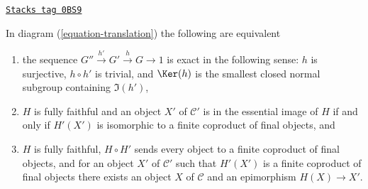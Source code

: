 \begin{lemma}
\label{pione-lemma-functoriality-galois-ses}
\href{https://stacks.math.columbia.edu/tag/0BS9}{\texttt{Stacks tag 0BS9}}

In diagram (\ref{equation-translation}) the following are equivalent
\begin{enumerate}
\item the sequence $G'' \xrightarrow{h'} G' \xrightarrow{h} G \to 1$
is exact in the following sense: $h$ is surjective, $h \circ h'$ is trivial,
and $\Ker(h)$ is the smallest closed normal subgroup containing $\Im(h')$,
\item $H$ is fully faithful and an object $X'$ of $\mathcal{C}'$ is in
the essential image of $H$ if and only if $H'(X')$ is isomorphic to a
finite coproduct of final objects, and
\item $H$ is fully faithful, $H \circ H'$ sends every object to a finite
coproduct of final objects, and for an object $X'$ of $\mathcal{C}'$
such that $H'(X')$ is a finite coproduct of final objects there exists
an object $X$ of $\mathcal{C}$ and an epimorphism $H(X) \to X'$.
\end{enumerate}
\end{lemma}

